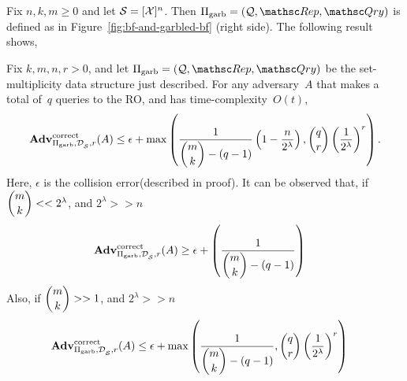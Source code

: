 Fix $n,k,m \geq 0$ and let $\mathcal{S}=[{\cal X}]^n$.  Then $\Pi_{\mathrm{garb}}= (\calQ,\Rep, \Qry)$ is defined as in Figure~\ref{fig:bf-and-garbled-bf} (right side).  The following result shows,

\begin{theorem}\label{thm:gbf-correctness}
Fix $k,m,n,r>0$, and let $\Pi_{\mathrm{garb}}= (\calQ,\Rep, \Qry)$ be the set-multiplicity data structure just described. For any adversary~$A$ that makes a total of~$q$ queries to the RO, and has time-complexity~$O(t)$,
\[
\mathrm{\mathbf{Adv}}^{\mathrm{correct}}_{\Pi_{\mathrm{garb}},\mathcal{D}_{{\cal S}}^{},r}(A) \leq  \epsilon +  \max\left(\dfrac{1}{\dbinom{m}{k}-(q-1)}\left(1-\dfrac{n}{2^\lambda}\right), \dbinom{q}{r}\left(\dfrac{1}{2^\lambda}\right)^r \right).
\]
Here, $\epsilon$ is the collision error(described in proof).
It can be observed that, if $\dbinom{m}{k} << 2^\lambda$, and $2^\lambda >> n$
\begin{align*}
\mathrm{\mathbf{Adv}}^{\mathrm{correct}}_{\Pi_{\mathrm{garb}},\mathcal{D}_{{\cal S}}^{},r}(A) & \geq \epsilon + \left(\dfrac{1}{\dbinom{m}{k}-(q-1)}\right)
\end{align*}
Also, if $\dbinom{m}{k} >> 1$, and $2^\lambda >> n$
\begin{align*}
\mathrm{\mathbf{Adv}}^{\mathrm{correct}}_{\Pi_{\mathrm{garb}},\mathcal{D}_{{\cal S}}^{},r}(A) & \leq \epsilon + \max\left(\dfrac{1}{\dbinom{m}{k}-(q-1)}, \dbinom{q}{r}\left(\dfrac{1}{2^\lambda}\right)^r \right)
\end{align*}
\end{theorem}
